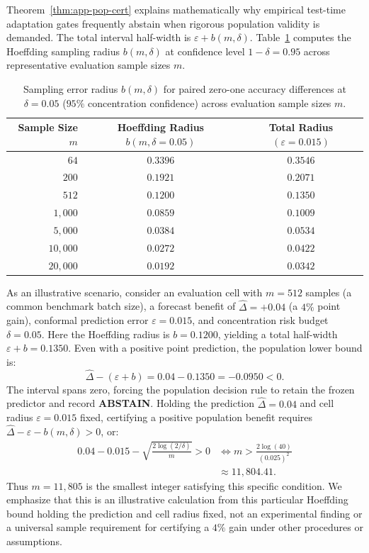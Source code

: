 Theorem~\ref{thm:app-pop-cert} explains mathematically why empirical test-time adaptation gates frequently abstain
when rigorous population validity is demanded. The total interval half-width is $\varepsilon + b(m, \delta)$.
Table~\ref{tab:sample-size-hoeffding} computes the Hoeffding sampling radius $b(m, \delta)$ at confidence level
$1 - \delta = 0.95$ across representative evaluation sample sizes $m$.

\begin{table}[h]
\centering
\footnotesize
\caption{Sampling error radius $b(m, \delta)$ for paired zero-one accuracy differences at $\delta = 0.05$
($95\%$ concentration confidence) across evaluation sample sizes $m$.}
\label{tab:sample-size-hoeffding}
\begin{tabular}{@{}rcc@{}}
\toprule
\shortstack{Sample\\Size $m$} & \shortstack{Hoeffding Radius\\$b(m, \delta=0.05)$} & \shortstack{Total Radius\\$(\varepsilon = 0.015)$} \\
\midrule
$64$ & $0.3396$ & $0.3546$ \\
$200$ & $0.1921$ & $0.2071$ \\
$512$ & $0.1200$ & $0.1350$ \\
$1{,}000$ & $0.0859$ & $0.1009$ \\
$5{,}000$ & $0.0384$ & $0.0534$ \\
$10{,}000$ & $0.0272$ & $0.0422$ \\
$20{,}000$ & $0.0192$ & $0.0342$ \\
\bottomrule
\end{tabular}
\end{table}

As an illustrative scenario, consider an evaluation cell with $m = 512$ samples (a common benchmark batch size),
a forecast benefit of $\widehat\Delta = +0.04$ (a $4\%$ point gain), conformal prediction error $\varepsilon = 0.015$,
and concentration risk budget $\delta = 0.05$. Here the Hoeffding radius is $b = 0.1200$, yielding a total half-width
$\varepsilon + b = 0.1350$. Even with a positive point prediction, the population lower bound is:
\[
 \widehat\Delta - (\varepsilon + b) = 0.04 - 0.1350 = -0.0950 < 0.
\]
The interval spans zero, forcing the population decision rule to retain the frozen predictor and record \textbf{ABSTAIN}.
Holding the prediction $\widehat\Delta = 0.04$ and cell radius $\varepsilon = 0.015$ fixed, certifying a positive
population benefit requires $\widehat\Delta - \varepsilon - b(m, \delta) > 0$, or:
\begin{align*}
 0.04 - 0.015 - \sqrt{\frac{2\log(2/\delta)}{m}} > 0 &\iff m > \frac{2\log(40)}{(0.025)^2} \\
 &\approx 11{,}804.41.
\end{align*}
Thus $m = 11{,}805$ is the smallest integer satisfying this specific condition. We emphasize that this is an
illustrative calculation from this particular Hoeffding bound holding the prediction and cell radius fixed, not
an experimental finding or a universal sample requirement for certifying a $4\%$ gain under other procedures or assumptions.

